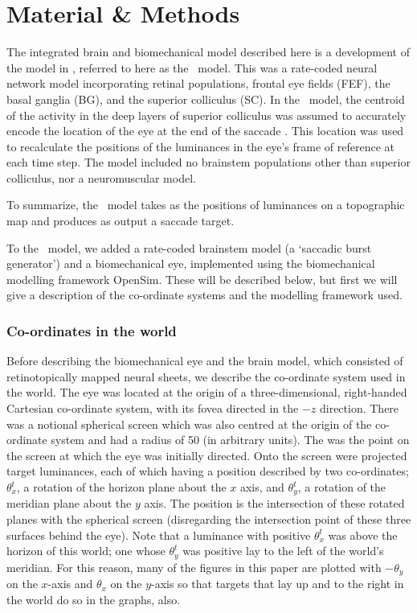 \documentclass{frontiersSCNS}
\begin{document}
\section{Material \& Methods}

The integrated brain and biomechanical model described here is a
development of the model in \cite{cope_basal_2017},
referred to here as the \ccg~model. This was a rate-coded neural
network model incorporating retinal populations, frontal eye fields
(FEF), the basal ganglia (BG), and the superior colliculus (SC). In
the \ccg~model, the centroid of the activity in the deep
layers of superior colliculus was assumed to accurately encode the
location of the eye at the end of the
saccade \citep{wurtz_activity_1972,robinson_eye_1972,van_gisbergen_collicular_1987,mcilwain_lateral_1982}.
This location was used to recalculate the positions of the luminances in
the eye's frame of reference at each time step. The model included no
brainstem populations other than superior colliculus, nor a
neuromuscular model.

To summarize, the \ccg~model takes as  the positions
of luminances on a topographic map and produces as output a saccade
target.

To the \ccg~model, we added a rate-coded brainstem model (a `saccadic
burst generator') and a biomechanical eye, implemented using the
biomechanical modelling framework OpenSim.
These will be described below, but first we will give a description of
the co-ordinate systems and the modelling framework used.

\subsubsection{Co-ordinates in the world}

Before describing the biomechanical eye and the brain model, which consisted
of retinotopically mapped neural sheets, we describe the co-ordinate system
used in the world. The eye was located at the origin of a three-dimensional, right-handed
Cartesian co-ordinate system, with its fovea directed in the $-z$ direction.
There was a notional spherical screen which was also centred at the origin of the
co-ordinate system and had a radius of 50 (in arbitrary units). The  was the point on the
screen at which the eye was initially directed.
Onto the screen were projected target luminances, each of which having a position
described by two co-ordinates; $\theta_{x}^{t}$, a
rotation of the horizon plane about the $x$ axis, and $\theta_{y}^{t}$, a rotation
of the meridian plane about the $y$ axis. The position is the intersection
of these rotated planes with the spherical screen (disregarding
the intersection point of these three surfaces behind the eye).
%
Note that a luminance with positive $\theta_{x}^{t}$ was above the horizon of this world;
one whose $\theta_{y}^{t}$ was positive lay to the left of the world's meridian. For this
reason, many of the figures in this paper are plotted with $-\theta_{y}$ on the
$x$-axis and $\theta_{x}$ on the $y$-axis so that targets that lay up and to the right
in the world do so in the graphs, also.
\end{document}
